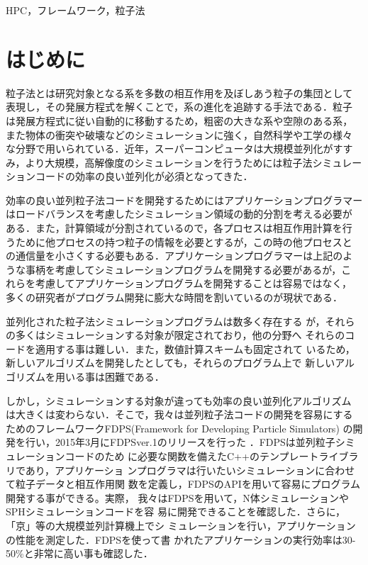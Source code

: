 \documentclass[submit]{ipsj}
\begin{document}
\begin{jkeyword}
HPC，フレームワーク，粒子法
\end{jkeyword}

\maketitle

\section{はじめに}

粒子法とは研究対象となる系を多数の相互作用を及ぼしあう粒子の集団として
表現し，その発展方程式を解くことで，系の進化を追跡する手法である．粒子
は発展方程式に従い自動的に移動するため，粗密の大きな系や空隙のある系，
また物体の衝突や破壊などのシミュレーションに強く，自然科学や工学の様々
な分野で用いられている．近年，スーパーコンピュータは大規模並列化がすす
み，より大規模，高解像度のシミュレーションを行うためには粒子法シミュレー
ションコードの効率の良い並列化が必須となってきた．

効率の良い並列粒子法コードを開発するためにはアプリケーションプログラマー
はロードバランスを考慮したシミュレーション領域の動的分割を考える必要が
ある．また，計算領域が分割されているので，各プロセスは相互作用計算を行
うために他プロセスの持つ粒子の情報を必要とするが，この時の他プロセスと
の通信量を小さくする必要もある．アプリケーションプログラマーは上記のよ
うな事柄を考慮してシミュレーションプログラムを開発する必要があるが，こ
れらを考慮してアプリケーションプログラムを開発することは容易ではなく，
多くの研究者がプログラム開発に膨大な時間を割いているのが現状である．

並列化された粒子法シミュレーションプログラムは数多く存在する
\cite{1995LAMMPS}\cite{2005MNRAS.364.1105S}\cite{2009PASJ...61.1319I}\cite{2014GROMACS}\cite{Bedorf:2014:PGT:2683593.2683600}
が，それらの多くはシミュレーションする対象が限定されており，他の分野へ
それらのコードを適用する事は難しい．また，数値計算スキームも固定されて
いるため，新しいアルゴリズムを開発したとしても，それらのプログラム上で
新しいアルゴリズムを用いる事は困難である．

しかし，シミュレーションする対象が違っても効率の良い並列化アルゴリズム
は大きくは変わらない．そこで，我々は並列粒子法コードの開発を容易にする
ためのフレームワークFDPS(Framework for Developing Particle Simulators)
の開発を行い，2015年3月にFDPSver.1のリリースを行った
\cite{2016PASJ...68...54I}．FDPSは並列粒子シミュレーションコードのため
に必要な関数を備えたC++のテンプレートライブラリであり，アプリケーショ
ンプログラマは行いたいシミュレーションに合わせて粒子データと相互作用関
数を定義し，FDPSのAPIを用いて容易にプログラム開発する事ができる。実際，
我々はFDPSを用いて，N体シミュレーションやSPHシミュレーションコードを容
易に開発できることを確認した．さらに，「京」等の大規模並列計算機上でシ
ミュレーションを行い，アプリケーションの性能を測定した．FDPSを使って書
かれたアプリケーションの実行効率は30-50\%と非常に高い事も確認した．
\end{document}
